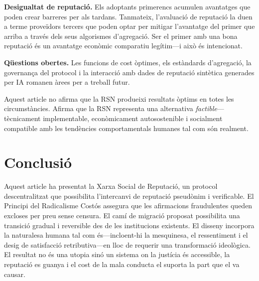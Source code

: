 \documentclass[11pt,a4paper,twocolumn]{article}
\begin{document}
\textbf{Desigualtat de reputació.} Els adoptants primerencs acumulen avantatges que poden crear barreres per als tardans. Tanmateix, l'avaluació de reputació la duen a terme proveïdors tercers que poden optar per mitigar l'avantatge del primer que arriba a través dels seus algorismes d'agregació. Ser el primer amb una bona reputació és un avantatge econòmic comparatiu legítim---i això és intencionat.

\textbf{Qüestions obertes.} Les funcions de cost òptimes, els estàndards d'agregació, la governança del protocol i la interacció amb dades de reputació sintètica generades per IA romanen àrees per a treball futur.

Aquest article no afirma que la RSN produeixi resultats òptims en totes les circumstàncies. Afirma que la RSN representa una alternativa \emph{factible}---tècnicament implementable, econòmicament autosostenible i socialment compatible amb les tendències comportamentals humanes tal com són realment.

\section{Conclusió}

Aquest article ha presentat la Xarxa Social de Reputació, un protocol descentralitzat que possibilita l'intercanvi de reputació pseudònim i verificable. El Principi del Radicalisme Costós assegura que les afirmacions fraudulentes queden excloses per preu sense censura. El camí de migració proposat possibilita una transició gradual i reversible des de les institucions existents. El disseny incorpora la naturalesa humana tal com és---incloent-hi la mesquinesa, el ressentiment i el desig de satisfacció retributiva---en lloc de requerir una transformació ideològica. El resultat no és una utopia sinó un sistema on la justícia és accessible, la reputació es guanya i el cost de la mala conducta el suporta la part que el va causar.


\end{document}
